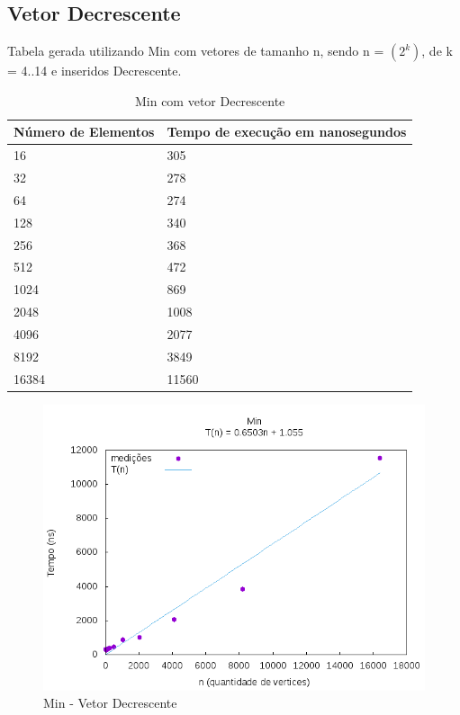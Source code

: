 \documentclass[12pt,a4paper,twoside]{report}
\begin{document}
\subsection{Vetor Decrescente}
Tabela gerada utilizando Min com vetores de tamanho n, sendo n = $(2^k)$, de k = 4..14 e inseridos Decrescente.
\begin{table}[H]
\centering
\caption{Min com vetor Decrescente}
\label{my-label}
\begin{tabular}{|l|l|}
\hline
\multicolumn{1}{|c|}{\textbf{Número de Elementos}} & \multicolumn{1}{c|}{\textbf{Tempo de execução em nanosegundos}} \\ \hline
16 & 305 \\ \hline
32 & 278 \\ \hline
64 & 274 \\ \hline
128 & 340 \\ \hline
256 & 368 \\ \hline
512 & 472 \\ \hline
1024 & 869 \\ \hline
2048 & 1008 \\ \hline
4096 & 2077 \\ \hline
8192 & 3849 \\ \hline
16384 & 11560 \\ \hline

\end{tabular}
\end{table}

\begin{figure}[H]
    \centering
    \includegraphics[width=0.7\linewidth]{graficos/Min/Decrescente/Min.png}
  \caption{Min - Vetor Decrescente}
\end{figure}
\end{document}
